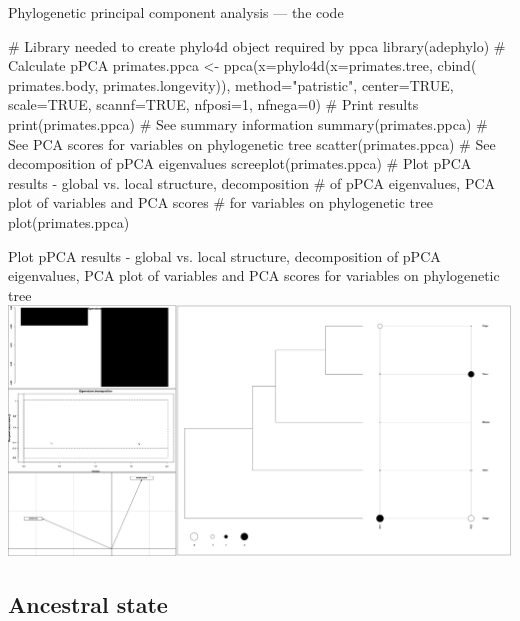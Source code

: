 \documentclass[compress, ucs, xelatex, 11pt, xcolor=svgnames,
	hyperref={
		bookmarks=true,
		unicode=true,
		colorlinks=true,
		pdftitle={Molecular data in R},
		plainpages=false,
		pdfauthor={Vojtech Zeisek},
		pdfsubject={Course about phylogeny and evolution in R},
		pdfcreator={XeLaTeX},
		pdfkeywords={R, evolution, phylogeny, molecular data},
		linkcolor=Tomato,
		anchorcolor=SaddleBrown,
		citecolor=Goldenrod,
		filecolor=DarkMagenta,
		menucolor=Sienna,
		urlcolor=DarkTurquoise,
		pdftex},
	url={hyphens, lowtilde} %
	]{beamer}
\begin{document}
\begin{frame}[fragile]{Phylogenetic principal component analysis --- the code}
	\begin{spluscode}
    # Library needed to create phylo4d object required by ppca
    library(adephylo)
    # Calculate pPCA
    primates.ppca <- ppca(x=phylo4d(x=primates.tree, cbind(
      primates.body, primates.longevity)), method="patristic",
      center=TRUE, scale=TRUE, scannf=TRUE, nfposi=1, nfnega=0)
    # Print results
    print(primates.ppca)
    # See summary information
    summary(primates.ppca)
    # See PCA scores for variables on phylogenetic tree
    scatter(primates.ppca)
    # See decomposition of pPCA eigenvalues
    screeplot(primates.ppca)
    # Plot pPCA results - global vs. local structure, decomposition
    # of pPCA eigenvalues, PCA plot of variables and PCA scores
    # for variables on phylogenetic tree
    plot(primates.ppca)
	\end{spluscode}
\end{frame}

\begin{frame}{Plot pPCA results - global vs. local structure, decomposition of pPCA eigenvalues, PCA plot of variables and PCA scores for variables on phylogenetic tree}
	\includegraphics[width=\textwidth]{ppca.png}
\end{frame}

\subsection{Ancestral state}
\end{document}
